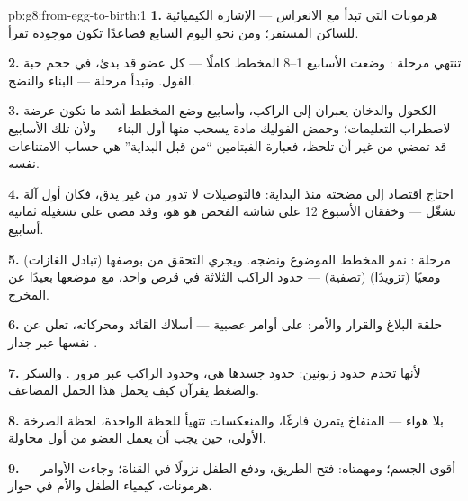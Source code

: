 \begin{solution}{pb:g8:from-egg-to-birth:1}
\textbf{1.} هرمونات  التي تبدأ مع الانغراس ---
الإشارة الكيميائية للساكن المستقر؛ ومن نحو اليوم السابع
فصاعدًا تكون موجودة تقرأ.

\textbf{2.} تنتهي مرحلة : وضعت الأسابيع 1--8
المخطط كاملًا --- كل عضو قد بدئ، في حجم حبة الفول. وتبدأ
مرحلة  --- البناء والنضج.

\textbf{3.} الكحول والدخان يعبران إلى الراكب، وأسابيع
وضع المخطط أشد ما تكون عرضة لاضطراب التعليمات؛ وحمض
الفوليك مادة يسحب منها أول البناء --- ولأن تلك الأسابيع
قد تمضي من غير أن تلحظ، فعبارة الفيتامين ``من قبل
البداية'' هي حساب الامتناعات نفسه.

\textbf{4.} احتاج اقتصاد  إلى مضخته منذ البداية:
فالتوصيلات لا تدور من غير  يدق، فكان أول آلة تشغّل ---
وخفقان الأسبوع 12 على شاشة الفحص هو هو، وقد مضى على
تشغيله ثمانية أسابيع.

\textbf{5.} مرحلة : نمو المخطط الموضوع ونضجه.
ويجري التحقق من  بوصفها  (تبادل الغازات) ومعيًا
(تزويدًا)  (تصفية) --- حدود الراكب الثلاثة في قرص
واحد، مع موضعها بعيدًا عن المخرج.

\textbf{6.} حلقة البلاغ والقرار والأمر:   على
أوامر عصبية --- أسلاك القائد ومحركاته، تعلن عن نفسها عبر
جدار .

\textbf{7.} لأنها تخدم حدود زبونين: حدود جسدها هي، وحدود
الراكب عبر مرور . والسكر والضغط يقرآن كيف يحمل
هذا الحمل المضاعف.

\textbf{8.}  بلا هواء --- المنفاخ يتمرن
فارغًا،  والمنعكسات تتهيأ للحظة الواحدة، لحظة
الصرخة الأولى، حين يجب أن يعمل العضو من أول محاولة.

\textbf{9.}  --- أقوى  الجسم؛ ومهمتاه: فتح
الطريق، ودفع الطفل نزولًا في القناة؛ وجاءت الأوامر
هرمونات، كيمياء الطفل والأم في حوار.


\end{solution}
